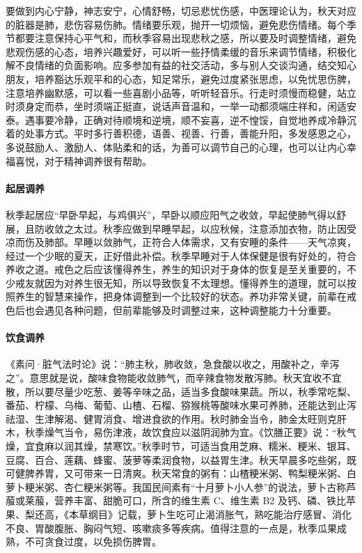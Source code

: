 要做到内心宁静，神志安宁，心情舒畅，切忌悲忧伤感，中医理论认为，秋天对应的脏器是肺，悲伤容易伤肺。情绪要乐观，抛开一切烦恼，避免悲伤情绪。每个季节都要注意保持心平气和，而秋季容易出现悲秋之感，所以要及时调整情绪，避免悲观伤感的心态，培养兴趣爱好，可以听一些抒情柔缓的音乐来调节情绪，积极化解不良情绪的负面影响。应多参加有益的社交活动，多与别人交谈沟通，结交知心朋友，培养豁达乐观平和的心态，知足常乐，避免过度紧张思虑，以免忧思伤脾，注意培养幽默感，可以看一些喜剧小品等，听听轻音乐。行走时须慢而稳健，站立时须身定而恭，坐时须端正挺直，说话声音温和，一举一动都须端庄祥和，闲适安泰。遇事要冷静，正确对待顺境和逆境，顺不妄喜，逆不惶馁，自觉地养成冷静沉着的处事方式。平时多行善积德，语善、视善、行善，善能升阳，多发感恩之心，多说鼓励人、激励人、体贴柔和的话，为善可以调节自己的心理，也可以让内心幸福喜悦，对于精神调养很有帮助。

\paragraph{起居调养}

秋季起居应“早卧早起，与鸡俱兴”，早卧以顺应阳气之收敛，早起使肺气得以舒展，且防收敛之太过。秋季应做到早睡早起，以应秋候，注意添加衣物，防止因受凉而伤及肺部。早睡以敛肺气，正符合人体需求，又有安睡的条件——天气凉爽，经过一个少眠的夏天，正好借此补偿。秋季早睡对于人体保健是很有好处的，符合养收之道。戒色之后应该懂得养生，养生的知识对于身体的恢复是至关重要的，不少戒友就因为对养生很无知，所以导致恢复不太理想。懂得养生的道理，就可以按照养生的智慧来操作，把身体调整到一个比较好的状态。养功非常关键，前辈在戒色后也会遇见各种问题，但前辈能够及时调整过来，这种调整能力十分重要。

\paragraph{饮食调养}

《素问·脏气法时论》说：“肺主秋，肺收敛，急食酸以收之，用酸补之，辛泻之”。意思就是说，酸味食物能收敛肺气，而辛辣食物发散泻肺。秋天宜收不宜散，所以要尽量少吃葱、姜等辛味之品，适当多食酸味果蔬。所以，秋季常吃梨、番茄、柠檬、乌梅、葡萄、山楂、石榴、猕猴桃等酸味水果可养肺，还能达到止泻祛湿、生津解渴、健胃消食、增进食欲的作用。秋时肺金当令，肺金太旺则克肝木，秋季燥气当令，易伤津液，故饮食应以滋阴润肺为宜。《饮膳正要》说：“秋气燥，宜食麻以润其燥，禁寒饮。”秋季时节，可适当食用芝麻、糯米、粳米、银耳、豆腐、百合、莲藕、蜂蜜、菠萝等柔润食物，以益胃生津。秋天早晨多吃些粥，既可健脾养胃，又可带来一日清爽。秋天常食的粥有：山楂粳米粥、鸭梨粳米粥、白萝卜粳米粥、杏仁粳米粥等。我国民间素有“十月萝卜小人参”的说法，萝卜古称芦菔或莱菔，营养丰富、甜脆可口，所含的维生素 C、维生素 B2 及钙、磷、铁比苹果、梨还高，《本草纲目》记载，萝卜生吃可止渴消胀气，熟吃能治疗感冒、消化不良、胃酸腹胀、胸闷气短、咳嗽痰多等疾病。值得注意的一点是，秋季瓜果成熟，不可贪食过度，以免损伤脾胃。

